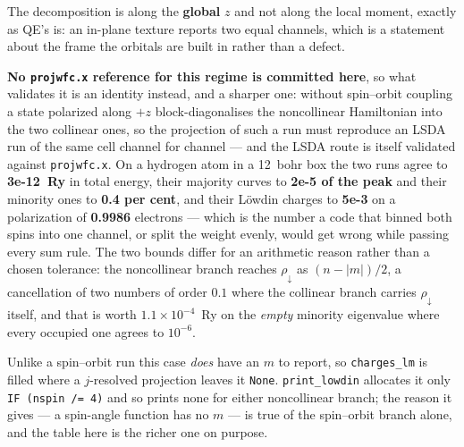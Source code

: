 \documentclass[11pt,a4paper]{article}
\newcommand{\code}[1]{\texttt{\small #1}}
\begin{document}

The decomposition is along the \textbf{global} $z$ and not along the local
moment, exactly as QE's is: an in-plane texture reports two equal channels,
which is a statement about the frame the orbitals are built in rather than a
defect.

\textbf{No \code{projwfc.x} reference for this regime is committed here}, so
what validates it is an identity instead, and a sharper one: without spin--orbit
coupling a state polarized along $+z$ block-diagonalises the noncollinear
Hamiltonian into the two collinear ones, so the projection of such a run must
reproduce an LSDA run of the same cell channel for channel --- and the LSDA
route is itself validated against \code{projwfc.x}. On a hydrogen atom in a 12~bohr box the two
runs agree to \textbf{3e-12~Ry} in total energy, their majority curves to
\textbf{2e-5 of the peak} and their minority ones to \textbf{0.4 per cent}, and
their Löwdin charges to \textbf{5e-3} on a polarization of \textbf{0.9986}
electrons --- which is the number a code that binned both spins into one channel,
or split the weight evenly, would get wrong while passing every sum rule. The two
bounds differ for an arithmetic reason rather than a chosen tolerance: the
noncollinear branch reaches $\rho_\downarrow$ as $(n - |m|)/2$, a cancellation of
two numbers of order $0.1$ where the collinear branch carries $\rho_\downarrow$
itself, and that is worth $1.1\times10^{-4}$~Ry on the \emph{empty} minority
eigenvalue where every occupied one agrees to $10^{-6}$.

Unlike a spin--orbit run this case \emph{does} have an $m$ to report, so
\code{charges\_lm} is filled where a $j$-resolved projection leaves it
\code{None}. \code{print\_lowdin} allocates it only \code{IF (nspin /= 4)} and
so prints none for either noncollinear branch; the reason it gives --- a
spin-angle function has no $m$ --- is true of the spin--orbit branch alone, and
the table here is the richer one on purpose.
\end{document}
